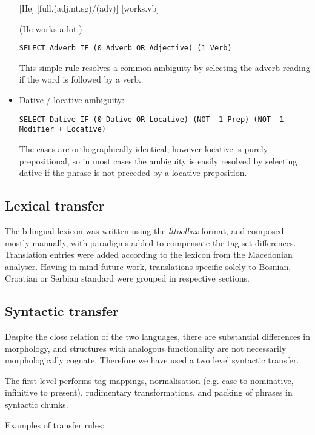 \documentclass{book}
\begin{document}
\begin{itemize}
{[He] [full{\sc.(adj.nt.sg)/(adv)}] [works{\sc.vb}]

(He works a lot.)
}

\texttt{SELECT Adverb IF (0 Adverb OR Adjective) (1 Verb)}

This simple rule resolves a common ambiguity by selecting the adverb reading if the word is followed by a verb.


\item Dative / locative ambiguity:

\texttt{SELECT Dative IF (0 Dative OR Locative) (NOT -1 Prep) (NOT -1 Modifier + Locative)}

The cases are orthographically identical, however locative
is purely prepositional, so in most cases the ambiguity is easily
resolved by selecting dative if the phrase
is not preceded by a locative preposition.

\end{itemize}

\subsection*{Lexical transfer}
The bilingual lexicon was written using the \emph{lttoolbox} format, and composed mostly 
manually, with paradigms added to compensate the tag set differences.
Translation entries were added according to the lexicon from 
the Macedonian analyser. Having in mind future work, translations specific solely 
to Bosnian, Croatian or Serbian standard were grouped in respective sections.

\subsection*{Syntactic transfer}
Despite the close relation of the two languages, there are substantial 
differences in morphology, and structures with analogous functionality 
are not necessarily morphologically cognate. Therefore we have used 
a two level syntactic transfer. 

The first level performs tag mappings, normalisation (e.g. 
case to nominative, infinitive to present), 
rudimentary transformations, and packing of phrases in syntactic chunks. 

Examples of transfer rules:
\end{document}
